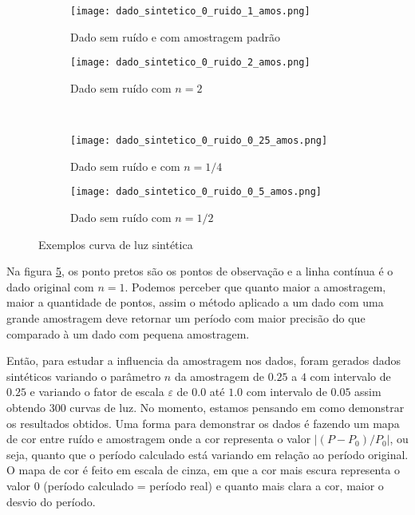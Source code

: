 \begin{figure}[H]
\centering
\begin{subfigure}{.5\textwidth}
  \centering
  \texttt{[image: dado\_sintetico\_0\_ruido\_1\_amos.png]}
  \caption{Dado sem ruído e com amostragem padrão}
  \label{fig:1amos}
\end{subfigure}%
\begin{subfigure}{.5\textwidth}
  \centering
  \texttt{[image: dado\_sintetico\_0\_ruido\_2\_amos.png]}
  \caption{Dado sem ruído com $n=2$}
  \label{fig:2amos}
  \end{subfigure}
\\
\begin{subfigure}{.5\textwidth}
  \centering
  \texttt{[image: dado\_sintetico\_0\_ruido\_0\_25\_amos.png]}
  \caption{Dado sem ruído e com $n=1/4$}
  \label{fig:025amos}
\end{subfigure}%
\begin{subfigure}{.5\textwidth}
  \centering
  \texttt{[image: dado\_sintetico\_0\_ruido\_0\_5\_amos.png]}
  \caption{Dado sem ruído com $n=1/2$}
  \label{fig:05amos}
  \end{subfigure}
\caption{Exemplos curva de luz sintética}
\label{fig:exemplo_curva_luz}
\end{figure}

Na figura \ref{fig:exemplo_curva_luz}, os ponto pretos são os pontos de observação e a linha contínua é o dado original com \(n=1\). Podemos perceber que quanto maior a amostragem, maior a quantidade de pontos, assim o método aplicado a um dado com uma grande amostragem deve retornar um período com maior precisão do que comparado à um dado com pequena amostragem.

Então, para estudar a influencia da amostragem nos dados, foram gerados dados sintéticos variando o parâmetro \(n\) da amostragem de $0.25$ a $4$ com intervalo de $0.25$ e variando o fator de escala $\varepsilon$ de $0.0$ até $1.0$ com intervalo de $0.05$ assim obtendo $300$ curvas de luz. No momento, estamos pensando em como demonstrar os resultados obtidos. Uma forma para demonstrar os dados é fazendo um mapa de cor entre ruído e amostragem onde a cor representa o valor \(|(P - P_0)/P_0|\), ou seja, quanto que o período calculado está variando em relação ao período original. O mapa de cor é feito em escala de cinza, em que a cor mais escura representa o valor 0 (período calculado = período real) e quanto mais clara a cor, maior o desvio do período.	%

